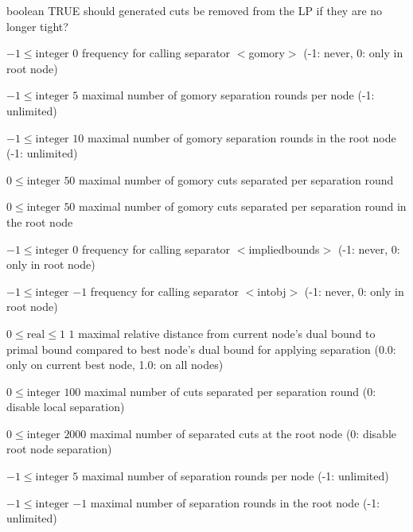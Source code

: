 %
{boolean}%
{TRUE}%
{should generated cuts be removed from the LP if they are no longer tight?}%
{}

%
{$-1\leq\textrm{integer}$}%
{$0$}%
{frequency for calling separator $<$gomory$>$ (-1: never, 0: only in root node)}%
{}

%
{$-1\leq\textrm{integer}$}%
{$5$}%
{maximal number of gomory separation rounds per node (-1: unlimited)}%
{}

%
{$-1\leq\textrm{integer}$}%
{$10$}%
{maximal number of gomory separation rounds in the root node (-1: unlimited)}%
{}

%
{$0\leq\textrm{integer}$}%
{$50$}%
{maximal number of gomory cuts separated per separation round}%
{}

%
{$0\leq\textrm{integer}$}%
{$50$}%
{maximal number of gomory cuts separated per separation round in the root node}%
{}

%
{$-1\leq\textrm{integer}$}%
{$0$}%
{frequency for calling separator $<$impliedbounds$>$ (-1: never, 0: only in root node)}%
{}

%
{$-1\leq\textrm{integer}$}%
{$-1$}%
{frequency for calling separator $<$intobj$>$ (-1: never, 0: only in root node)}%
{}

%
{$0\leq\textrm{real}\leq1$}%
{$1$}%
{maximal relative distance from current node's dual bound to primal bound compared to best node's dual bound for applying separation (0.0: only on current best node, 1.0: on all nodes)}%
{}

%
{$0\leq\textrm{integer}$}%
{$100$}%
{maximal number of cuts separated per separation round (0: disable local separation)}%
{}

%
{$0\leq\textrm{integer}$}%
{$2000$}%
{maximal number of separated cuts at the root node (0: disable root node separation)}%
{}

%
{$-1\leq\textrm{integer}$}%
{$5$}%
{maximal number of separation rounds per node (-1: unlimited)}%
{}

%
{$-1\leq\textrm{integer}$}%
{$-1$}%
{maximal number of separation rounds in the root node (-1: unlimited)}%
{}

